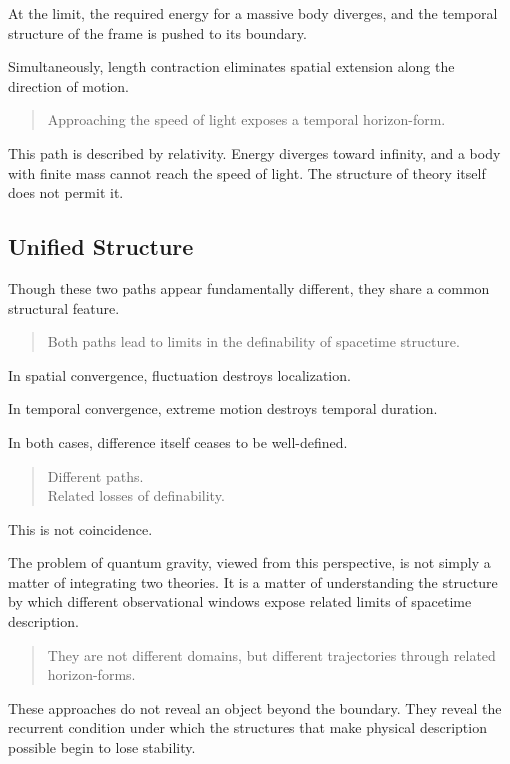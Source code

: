At the limit,
the required energy for a massive body diverges,
and the temporal structure of the frame is pushed to its boundary.

Simultaneously,
length contraction eliminates spatial extension
along the direction of motion.

\medskip
\begin{quote}
Approaching the speed of light exposes a temporal horizon-form.
\end{quote}
\medskip

This path is described by relativity.
Energy diverges toward infinity,
and a body with finite mass cannot reach the speed of light.
The structure of theory itself does not permit it.

\subsection{Unified Structure}

Though these two paths appear fundamentally different,
they share a common structural feature.

\medskip
\begin{quote}
Both paths lead to limits in the definability of spacetime structure.
\end{quote}
\medskip

In spatial convergence,
fluctuation destroys localization.

In temporal convergence,
extreme motion destroys temporal duration.

In both cases,
difference itself ceases to be well-defined.

\medskip
\begin{quote}
Different paths.\\
Related losses of definability.
\end{quote}
\medskip

This is not coincidence.

The problem of quantum gravity, viewed from this perspective,
is not simply a matter of integrating two theories.
It is a matter of understanding the structure
by which different observational windows expose related limits
of spacetime description.

\medskip
\begin{quote}
They are not different domains,
but different trajectories through related horizon-forms.
\end{quote}
\medskip

These approaches do not reveal an object beyond the boundary.
They reveal the recurrent condition
under which the structures that make physical description possible
begin to lose stability.

